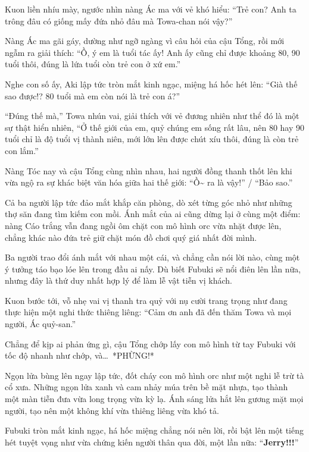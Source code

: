 \documentclass[../main.tex]{subfiles}
\begin{document}
Kuon liền nhíu mày, ngước nhìn nàng Ác ma với vẻ khó hiểu: ``Trẻ con? Anh ta trông đâu có giống mấy đứa nhỏ đâu mà Towa-chan nói vậy?''

Nàng Ác ma gãi gáy, dường như ngỡ ngàng vì câu hỏi của cậu Tổng, rồi mới ngẫm ra giải thích: ``Ồ, ý em là tuổi tác ấy! Anh ấy cũng chỉ được khoảng 80, 90 tuổi thôi, đúng là lứa tuổi còn trẻ con ở xứ em.''

Nghe con số ấy, Aki lập tức tròn mắt kinh ngạc, miệng há hốc hét lên: ``Già thế sao được!? 80 tuổi mà em còn nói là trẻ con á?''

``Đúng thế mà,'' Towa nhún vai, giải thích với vẻ đương nhiên như thể đó là một sự thật hiển nhiên, ``Ở thế giới của em, quỷ chúng em sống rất lâu, nên 80 hay 90 tuổi chỉ là độ tuổi vị thành niên, mới lớn lên được chút xíu thôi, đúng là còn trẻ con lắm.''

Nàng Tóc nay và cậu Tổng cùng nhìn nhau, hai người đồng thanh thốt lên khi vừa ngộ ra sự khác biệt văn hóa giữa hai thế giới: ``Ồ\~{} ra là vậy!'' / ``Bảo sao.''


Cả ba người lập tức đảo mắt khắp căn phòng, dò xét từng góc nhỏ như những thợ săn đang tìm kiếm con mồi. Ánh mắt của ai cũng dừng lại ở cùng một điểm: nàng Cáo trắng vẫn đang ngồi ôm chặt con mô hình orc vừa nhặt được lên, chẳng khác nào đứa trẻ giữ chặt món đồ chơi quý giá nhất đời mình.

Ba người trao đổi ánh mắt với nhau một cái, và chẳng cần nói lời nào, cùng một ý tưởng táo bạo lóe lên trong đầu ai nấy. Dù biết Fubuki sẽ nổi điên lên lần nữa, nhưng đây là thứ duy nhất hợp lý để làm lễ vật tiễn vị khách.

Kuon bước tới, vỗ nhẹ vai vị thanh tra quỷ với nụ cười trang trọng như đang thực hiện một nghi thức thiêng liêng: ``Cảm ơn anh đã đến thăm Towa và mọi người, Ác quỷ-san.''

Chẳng để kịp ai phản ứng gì, cậu Tổng chớp lấy con mô hình từ tay Fubuki với tốc độ nhanh như chớp, và\dots\ *PHỪNG!*

Ngọn lửa bùng lên ngay lập tức, đốt cháy con mô hình orc như một nghi lễ trừ tà cổ xưa. Những ngọn lửa xanh và cam nhảy múa trên bề mặt nhựa, tạo thành một màn tiễn đưa vừa long trọng vừa kỳ lạ. Ánh sáng lửa hắt lên gương mặt mọi người, tạo nên một không khí vừa thiêng liêng vừa khó tả.

Fubuki tròn mắt kinh ngạc, há hốc miệng chẳng nói nên lời, rồi bật lên một tiếng hét tuyệt vọng như vừa chứng kiến người thân qua đời, một lần nữa: ``\textbf{Jerry!!!}''
\end{document}

